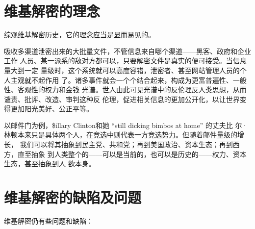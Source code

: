 \section{维基解密的理念}

综观维基解密历史，它的理念应当是显而易见的。

吸收多渠道泄密出来的大批量文件，不管信息来自哪个渠道——黑客、政府和企业工作
人员、某一派系的敌对方都可以，只要解密文件是真实的便可接受。当信息量大到一定
量级时，这个系统就可以高度容错，泄密者、甚至网站管理人员的个人主观就不起作用
了。诸多事件就会一个个结合起来，构成为更富普遍性、一般性、客观性的权力和金钱
光谱。世人由此可见光谱中的反伦理反人类思想，从而谴责、批评、改造、审判这种反
伦理，促进相关信息的更加公开化，以让世界变得更加阳光美好、公正平等。

以邮件门为例，\$illary Clinton和她 ``still dicking bimbos at home'' 的丈夫比
尔·林顿本来只是具体两个人，在竞选中则代表一方竞选势力。但随着邮件量级的增长，
我们可以将其抽象到民主党、共和党；再到美国政治、资本生态；再到西方，直至抽象
到人类整个的——可以是当前的，也可以是历史的——权力、资本生态，甚至抽象到人
欲本身。

\section{维基解密的缺陷及问题}

维基解密仍有些问题和缺陷：

